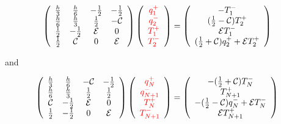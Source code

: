 \begin{eqnarray}
\left(
\begin{array}{cccc}
\frac{h}{3}    &  \frac{h}{6} & -\frac{1}{2}   &-\frac{1}{2} \\
\frac{h}{6}    &  \frac{h}{3} & \frac{1}{2} & -{\cal C} \\
\frac{1}{2}    & -\frac{1}{2} & {\cal E} & 0\\
\frac{1}{2} & {\cal C} & 0 & {\cal E}
\end{array}
\right) \left(
\begin{array}{c}
     \color{red}{q_1^+}  \\
     \color{red}{q_{2}^-} \\
     \color{red}{T_1^+} \\
     \color{red}{T_{2}^-}
\end{array}
\right)=\left(
\begin{array}{cc}
     -T_1^-  \\
      (\frac{1}{2}-{\cal{C}}) T_{2}^+ \\
     {\cal{E}} T_1^-  \\
      (\frac{1}{2}+{\cal{C}})q_{2}^++{\cal{E}} T_{2}^+
\end{array}
\right)
\nonumber \
\end{eqnarray}

and 


\begin{eqnarray}
\left(
\begin{array}{cccc}
\frac{h}{3}    &  \frac{h}{6} & -{\cal C}   &-\frac{1}{2} \\
\frac{h}{6}    &  \frac{h}{3} & \frac{1}{2} & \frac{1}{2} \\
{\cal C}    & -\frac{1}{2} & {\cal E} & 0\\
\frac{1}{2} & -\frac{1}{2} & 0 & {\cal E}
\end{array}
\right) \left(
\begin{array}{c}
     \color{red}{q_N^+}  \\
     \color{red}{q_{N+1}^-} \\
     \color{red}{T_N^+} \\
     \color{red}{T_{N+1}^-}
\end{array}
\right)=\left(
\begin{array}{cc}
     -(\frac{1}{2}+{\cal{C}}) T_N^-  \\
      T_{N+1}^+ \\
     -(\frac{1}{2}-{\cal{C}})q_N^-+{\cal{E}} T_N^-  \\
      {\cal{E}} T_{N+1}^+
\end{array}
\right)
\nonumber \
\end{eqnarray}









